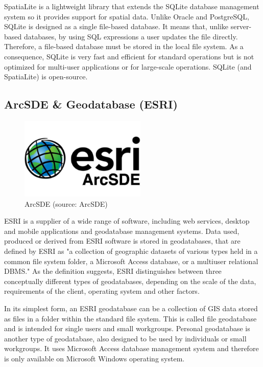 SpatiaLite is a lightweight library that extends the SQLite database
management system so it provides support for spatial data. Unlike
Oracle and PostgreSQL, SQLite is designed as a single file-based database. \cite{sqlitefile} It
means that, unlike server-based databases, by using SQL expressions a
user updates the file directly. Therefore, a file-based database must
be stored in the local file system. As a consequence, SQLite is very
fast and efficient for standard operations but is not optimized for
multi-user applications or for large-scale operations. SQLite (and
SpatiaLite) is open-source. \cite{sqliteopen}

\subsection{ArcSDE \& Geodatabase (ESRI)}

\begin{figure}[H] \centering
      \includegraphics[width=170pt]{./pictures/arcsde.png}
      \caption[ArcSDE logo]{ArcSDE (source: ArcSDE)}
      \label{fig:ArcSDE}
  \end{figure}
	
ESRI is a supplier of a wide range of  software, including web 
services, desktop and mobile applications and geodatabase management
systems. Data used, produced or derived from ESRI software is stored
in geodatabases, that are defined by ESRI as "a collection of
geographic datasets of various types held in a common file system
folder, a Microsoft Access database, or a multiuser relational
DBMS."\cite{esridef} As the definition suggests, ESRI distinguishes
between three conceptually different types of geodatabases, depending
on the scale of the data, requirements of the client, operating system
and other factors.

In its simplest form, an ESRI geodatabase can be a collection of GIS
data stored as files in a folder within the standard file system. This
is called file geodatabase and is intended for single users and small
workgroups. Personal geodatabase is another type of geodatabase, also
designed to be used by individuals or small workgroups. It uses
Microsoft Access database management system and therefore is only
available on Microsoft Windows operating system.

